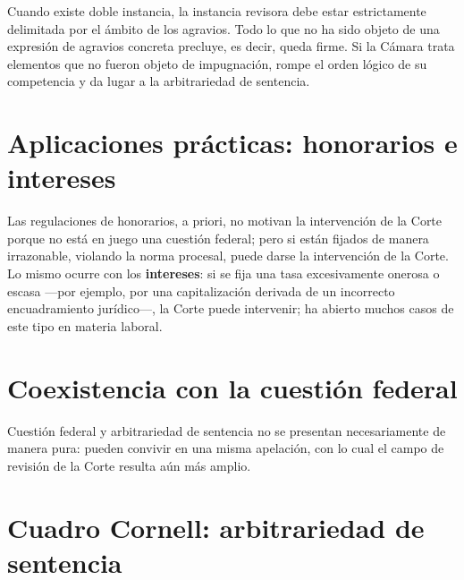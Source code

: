\documentclass[12pt,oneside]{book}
\begin{document}
\begin{important}
Cuando existe doble instancia, la instancia revisora debe estar estrictamente delimitada por el ámbito de los agravios. Todo lo que no ha sido objeto de una expresión de agravios concreta precluye, es decir, queda firme. Si la Cámara trata elementos que no fueron objeto de impugnación, rompe el orden lógico de su competencia y da lugar a la arbitrariedad de sentencia.
\end{important}

\section{Aplicaciones prácticas: honorarios e intereses}

Las regulaciones de honorarios, a priori, no motivan la intervención de la Corte porque no está en juego una cuestión federal; pero si están fijados de manera irrazonable, violando la norma procesal, puede darse la intervención de la Corte. Lo mismo ocurre con los \textbf{intereses}: si se fija una tasa excesivamente onerosa o escasa ---por ejemplo, por una capitalización derivada de un incorrecto encuadramiento jurídico---, la Corte puede intervenir; ha abierto muchos casos de este tipo en materia laboral.

\section{Coexistencia con la cuestión federal}

Cuestión federal y arbitrariedad de sentencia no se presentan necesariamente de manera pura: pueden convivir en una misma apelación, con lo cual el campo de revisión de la Corte resulta aún más amplio.

\section{Cuadro Cornell: arbitrariedad de sentencia}
\end{document}
